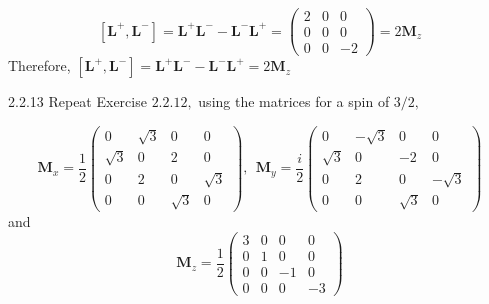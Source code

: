 \documentclass{styles/kaobook}
\begin{document}
$$
\left[\mathbf{L}^{+}, \mathbf{L}^{-}\right]=\mathbf{L}^{+} \mathbf{L}^{-}-\mathbf{L}^{-} \mathbf{L}^{+}=\left(\begin{array}{ccc}
2 & 0 & 0 \\
0 & 0 & 0 \\
0 & 0 & -2
\end{array}\right)=2 \mathbf{M}_{z}
$$
Therefore, $\left[\mathbf{L}^{+}, \mathbf{L}^{-}\right]=\mathbf{L}^{+} \mathbf{L}^{-}-\mathbf{L}^{-} \mathbf{L}^{+}=2 \mathbf{M}_{z}$











\begin{greenbox}{2.2.13}
Repeat Exercise $2.2 .12,$ using the matrices for a spin of $3 / 2,$

$$
\mathbf{M}_{x}=\frac{1}{2}\left(\begin{array}{cccc}
0 & \sqrt{3} & 0 & 0 \\
\sqrt{3} & 0 & 2 & 0 \\
0 & 2 & 0 & \sqrt{3} \\
0 & 0 & \sqrt{3} & 0
\end{array}\right), \ \ \mathbf{M}_{y}=\frac{i}{2}\left(\begin{array}{cccc}
0 & -\sqrt{3} & 0 & 0 \\
\sqrt{3} & 0 & -2 & 0 \\
0 & 2 & 0 & -\sqrt{3} \\
0 & 0 & \sqrt{3} & 0
\end{array}\right)
$$
and
$$
\mathbf{M}_{z}=\frac{1}{2}\left(\begin{array}{rrrr}
3 & 0 & 0 & 0 \\
0 & 1 & 0 & 0 \\
0 & 0 & -1 & 0 \\
0 & 0 & 0 & -3
\end{array}\right)
$$
\end{greenbox}
\end{document}

